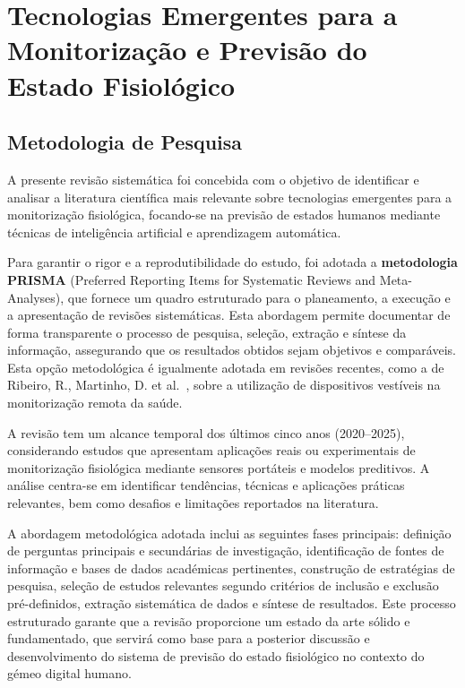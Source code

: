 \chapter{Tecnologias Emergentes para a Monitorização e Previsão do Estado Fisiológico}

\label{chap:TecnologiasEmergentes}

\section{Metodologia de Pesquisa}
\label{sec:metodologia}

A presente revisão sistemática foi concebida com o objetivo de identificar e analisar a literatura científica mais relevante sobre tecnologias emergentes para a monitorização fisiológica, focando-se na previsão de estados humanos mediante técnicas de inteligência artificial e aprendizagem automática.

Para garantir o rigor e a reprodutibilidade do estudo, foi adotada a \textbf{metodologia PRISMA} (Preferred Reporting Items for Systematic Reviews and Meta-Analyses), que fornece um quadro estruturado para o planeamento, a execução e a apresentação de revisões sistemáticas. Esta abordagem permite documentar de forma transparente o processo de pesquisa, seleção, extração e síntese da informação, assegurando que os resultados obtidos sejam objetivos e comparáveis. Esta opção metodológica é igualmente adotada em revisões recentes, como a de Ribeiro, R., Martinho, D. et al.~\cite{ribeiro2026wearable}, sobre a utilização de dispositivos vestíveis na monitorização remota da saúde.

A revisão tem um alcance temporal dos últimos cinco anos (2020–2025), considerando estudos que apresentam aplicações reais ou experimentais de monitorização fisiológica mediante sensores portáteis e modelos preditivos. A análise centra-se em identificar tendências, técnicas e aplicações práticas relevantes, bem como desafios e limitações reportados na literatura.

A abordagem metodológica adotada inclui as seguintes fases principais: definição de perguntas principais e secundárias de investigação, identificação de fontes de informação e bases de dados académicas pertinentes, construção de estratégias de pesquisa, seleção de estudos relevantes segundo critérios de inclusão e exclusão pré-definidos, extração sistemática de dados e síntese de resultados. Este processo estruturado garante que a revisão proporcione um estado da arte sólido e fundamentado, que servirá como base para a posterior discussão e desenvolvimento do sistema de previsão do estado fisiológico no contexto do gémeo digital humano.

